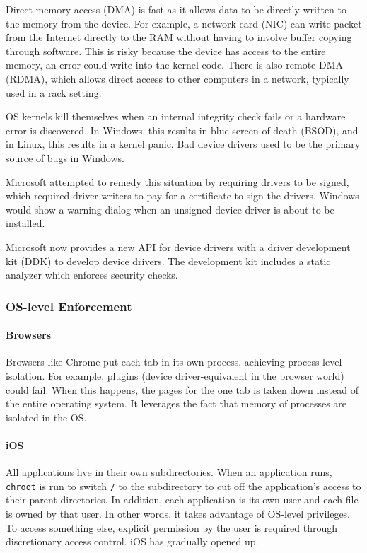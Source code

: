 \documentclass[twoside]{article}
\begin{document}
Direct memory access (DMA) is fast as it allows data to be directly written to the memory from the device. For example, a network card (NIC) can write packet from the Internet directly to the RAM without having to involve buffer copying through software. This is risky because the device has access to the entire memory, an error could write into the kernel code. There is also remote DMA (RDMA), which allows direct access to other computers in a network, typically used in a rack setting.

OS kernels kill themselves when an internal integrity check fails or a hardware error is discovered. In Windows, this results in blue screen of death (BSOD), and in Linux, this results in a kernel panic. Bad device drivers used to be the primary source of bugs in Windows.

Microsoft attempted to remedy this situation by requiring drivers to be signed, which required driver writers to pay for a certificate to sign the drivers. Windows would show a warning dialog when an unsigned device driver is about to be installed.

Microsoft now provides a new API for device drivers with a driver development kit (DDK) to develop device drivers. The development kit includes a static analyzer which enforces security checks.

\subsubsection{OS-level Enforcement}

\paragraph{Browsers}

Browsers like Chrome put each tab in its own process, achieving process-level isolation. For example, plugins (device driver-equivalent in the browser world) could fail. When this happens, the pages for the one tab is taken down instead of the entire operating system. It leverages the fact that memory of processes are isolated in the OS.

\paragraph{iOS}

All applications live in their own subdirectories. When an application runs, {\tt chroot} is run to switch \texttt{/} to the subdirectory to cut off the application's access to their parent directories. In addition, each application is its own user and each file is owned by that user. In other words, it takes advantage of OS-level privileges. To access something else, explicit permission by the user is required through discretionary access control. iOS has gradually opened up.
\end{document}
